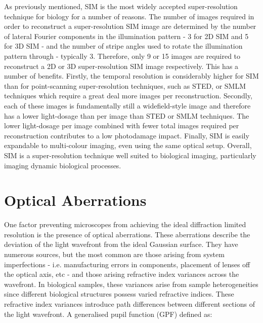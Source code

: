 As previously mentioned, SIM is the most widely accepted 
super-resolution technique for biology for a number of reasons. The 
number of images required in order to reconstruct a super-resolution 
SIM image are determined by the number of lateral Fourier components 
in the illumination pattern - 3 for 2D SIM and 5 for 3D SIM - and the
number of stripe angles used to rotate the illumination pattern through
- typically 3. Therefore, only 9 or 15 images are required to 
reconstruct a 2D or 3D super-resolution SIM image respectively. This
has a number of benefits. Firstly, the temporal resolution is 
considerably higher for SIM than for point-scanning super-resolution
techniques, such as STED, or SMLM techniques which require a great deal more 
images per reconstruction\cite{schermelleh2019super,leung2011review}.
Secondly, each of these images is fundamentally still a widefield-style
image and therefore has a lower light-dosage than per image than STED 
or SMLM techniques. The lower light-dosage per image combined with fewer
total images required per reconstruction contributes to a low 
photodamage impact. Finally, SIM is easily expandable to multi-colour 
imaging, even using the same optical 
setup\cite{wu2018faster,allen2014structured}. Overall, SIM is a 
super-resolution technique well suited to biological imaging, 
particularly imaging dynamic biological processes.

\section{Optical Aberrations}
\label{sec:aberrations}

One factor preventing microscopes from achieving the ideal diffraction
limited resolution is the presence of optical 
aberrations\cite{goodman2005introduction,wyant1992basic,wolf1951diffraction}.
These aberrations describe the deviation of the light wavefront
from the ideal Gaussian surface. They have numerous sources, but the most
common are those arising from system imperfections - i.e. manufacturing errors
in components, placement of lenses off the optical axis, etc - and those
arising refractive index variances across the 
wavefront\cite{kubby2013adaptive,booth2007adaptive}. In biological samples, 
these variances arise from sample heterogeneities since different biological
structures possess varied refractive 
indices\cite{bashkatov2011optical, jacques2013optical, kim2010measurement, sandell2011review}.
These refractive index variances introduce path differences between 
different sections of the light wavefront. A generalised pupil function 
(GPF) defined as\cite{antonello2014optimisation}:

